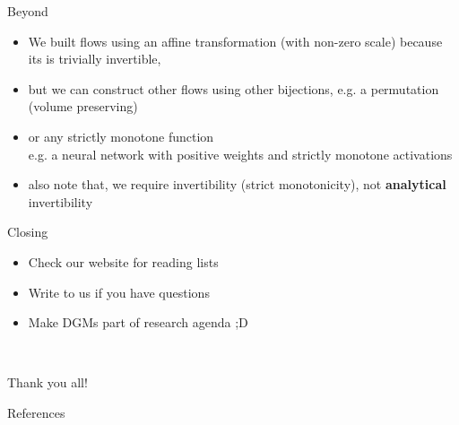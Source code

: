 \begin{frame}{Beyond}

\begin{itemize}
	\item We built flows using an affine transformation (with non-zero scale) because its is trivially invertible, \pause
	\item but we can construct other flows using other bijections, e.g. a permutation (volume preserving) \pause
	\item or any strictly monotone function\\
	e.g. a neural network with positive weights and strictly monotone activations \pause
	\item also note that, we require invertibility (strict monotonicity), not {\bf analytical} invertibility 
\end{itemize}
\end{frame}

\begin{frame}{Closing}

\begin{itemize}
	\item Check our website for reading lists
	\item Write to us if you have questions
	\item Make DGMs part of research agenda ;D
\end{itemize}
	
	~
	
	\hfill Thank you all!
\end{frame}

\begin{frame}[allowframebreaks]{References}


\nocite{KingmaEtAl:2016, RezendeMohamed:2015, HuangEtAl:2018}
\end{frame}
